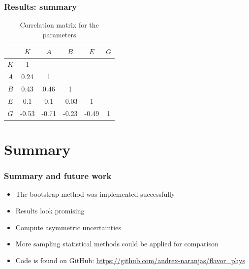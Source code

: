 \documentclass[10pt]{beamer}
\begin{document}
\begin{frame}
\frametitle{Results: summary}

\begin{table}[tb!]
\begin{center}
\hspace{-6mm}
\hspace{-6mm}

\begin{tabular}{c  c  c  c  c  c}\hline \hline
     &  $K$      &     $A$   &      $B$   &      $E$  & $G$ \\ \hline
 $K$ &     1     &           &            &           &   \\ 
 $A$ & 0.24 &      1    &            &           &   \\ 
 $B$ & 0.43 & 0.46 &      1     &           &   \\ 
 $E$ & 0.1 & 0.1 & -0.03 &      1    &   \\ 
 $G$ & -0.53 & -0.71 & -0.23 & -0.49 & 1 \\ \hline \hline
\end{tabular}


\end{center}
\caption{Correlation matrix for the parameters}
\label{tab:summary}
\end{table}

\end{frame}







\section{Summary}

\begin{frame}
\frametitle{Summary and future work}
\begin{beamerboxesrounded}[upper=uppercolor, lower=lowercolor, shadow=true]{} 
\begin{itemize}

\item The bootstrap method was implemented successfully
\item Results look promising
\item Compute asymmetric uncertainties
\item More sampling statistical methods could be applied for comparison
\item Code is found on GitHub: \url{https://github.com/andrex-naranjas/flavor_phys}


\end{itemize}
\end{beamerboxesrounded}

\end{frame}
\end{document}
